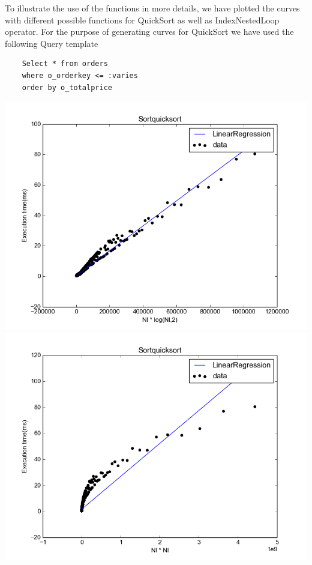 \documentclass{article}
\begin{document}
\begin{multicols}{2}
	To illustrate the use of the functions in more details, we have plotted the curves with 
	different possible functions for QuickSort as well as IndexNestedLoop operator. For the purpose
	of generating curves for QuickSort we have used the following Query template 
	
	\begin{framed}
	\begin{verbatim}
	Select * from orders
	where o_orderkey <= :varies 
	order by o_totalprice
	\end{verbatim}
	\end{framed}
	
	\includegraphics[scale=0.38]{Plots/quicksortnlogn.png}	
	\includegraphics[scale=0.35]{Plots/quicksortnl2.png}	


\end{multicols}
\end{document}
